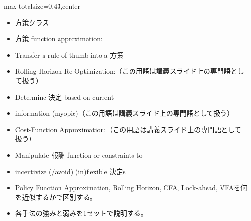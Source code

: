 \clearpage
{}
\begin{minipage}[t]{0.405\textwidth}
\begin{adjustbox}{max totalsize={\textwidth}{0.43\textheight},center}
\begin{minipage}{\textwidth}\scriptsize
{}\begin{itemize}
\item 方策クラス
\item 方策 function approximation:
\item Transfer a rule-of-thumb into a 方策
\item Rolling-Horizon Re-Optimization:（この用語は講義スライド上の専門語として扱う）
\item Determine 決定 based on current
\item information (myopic)（この用語は講義スライド上の専門語として扱う）
\item Cost-Function Approximation:（この用語は講義スライド上の専門語として扱う）
\item Manipulate 報酬 function or constraints to
\item incentivize (/avoid) (in)flexible 決定s
\end{itemize}\begin{itemize}
\item Policy Function Approximation, Rolling Horizon, CFA, Look-ahead, VFAを何を近似するかで区別する。
\item 各手法の強みと弱みを1セットで説明する。
\end{itemize}
\end{minipage}
\end{adjustbox}
\end{minipage}\hfill
